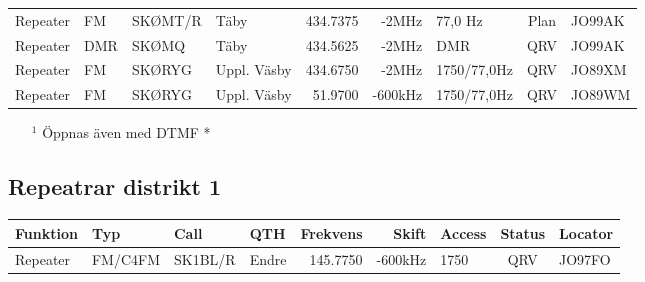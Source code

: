 \begin{landscape}
\begin{longtable}{llllrrlcl}
	Repeater          & FM           & SKØMT/R       & Täby         &          434.7375 &          -2MHz & 77,0 Hz         &      Plan       & JO99AK           \\
	Repeater          & DMR          & SKØMQ         & Täby         &          434.5625 &          -2MHz & DMR             &       QRV       & JO99AK           \\
	Repeater          & FM           & SKØRYG        & Uppl. Väsby  &          434.6750 &          -2MHz & 1750/77,0Hz    &       QRV       & JO89XM           \\
	Repeater          & FM           & SKØRYG        & Uppl. Väsby  &           51.9700 &        -600kHz & 1750/77,0Hz    &       QRV       & JO89WM
\end{longtable}
\begin{itemize}
	\item[$^1$] Öppnas även med DTMF *
\end{itemize}
\normalsize

\clearpage

\subsection{Repeatrar distrikt 1}
\footnotesize
\begin{longtable}{llllrrlcl}
\textbf{Funktion} & \textbf{Typ} & \textbf{Call} & \textbf{QTH} & \textbf{Frekvens} & \textbf{Skift} & \textbf{Access} & \textbf{Status} & \textbf{Locator} \\ \hline
\endhead
Repeater&	FM/C4FM&	SK1BL/R	&Endre	&145.7750	&-600kHz	&1750	&QRV	&JO97FO\\
\end{longtable}
\normalsize


\end{landscape}
